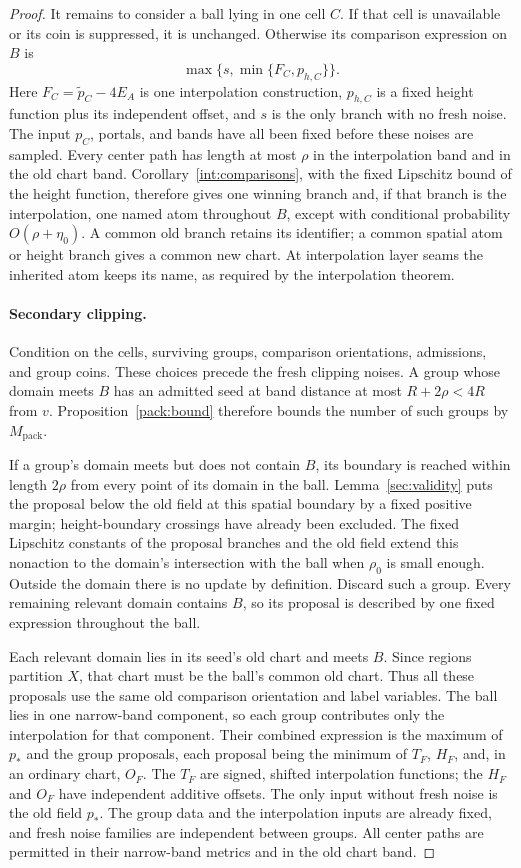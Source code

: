 \begin{proof}
It remains to consider a ball lying in one cell $C$. If that cell is
unavailable or its coin is suppressed, it is unchanged. Otherwise its
comparison expression on $B$ is
\[
 \max\{s,\min\{F_C,p_{h,C}\}\}.
\]
Here $F_C=\widetilde p_C-4E_A$ is one interpolation construction,
$p_{h,C}$ is a fixed height function plus its independent offset, and
$s$ is the only branch with no fresh noise. The input $p_C$, portals,
and bands have all been fixed before these noises are sampled.
Every center path has length at most $\rho$ in the interpolation band
and in the old chart band. Corollary~\ref{int:comparisons}, with the
fixed Lipschitz bound of the height function, therefore gives one
winning branch and, if that branch is the interpolation, one named atom throughout $B$,
except with conditional probability $O(\rho+\eta_0)$.
A common old branch retains its identifier; a common spatial atom or
height branch gives a common new chart. At interpolation layer seams
the inherited atom keeps its name, as required by the interpolation
theorem.

\paragraph{Secondary clipping.}
Condition on the cells, surviving groups, comparison orientations,
admissions, and group coins. These choices precede the fresh clipping
noises. A group whose domain meets $B$ has an admitted seed at band
distance at most $R+2\rho<4R$ from $v$. Proposition~\ref{pack:bound}
therefore bounds the number of such groups by $M_{\mathrm{pack}}$.

If a group's domain meets but does not contain $B$, its boundary is
reached within length $2\rho$ from every point of its domain in the
ball. Lemma~\ref{sec:validity} puts the proposal below the old field
at this spatial boundary by a fixed positive margin; height-boundary
crossings have already been excluded. The fixed Lipschitz constants
of the proposal branches and the old field extend this nonaction to
the domain's intersection with the ball when $\rho_0$ is small enough.
Outside the domain there is no update by definition. Discard such a group. Every
remaining relevant domain contains $B$, so its proposal is described
by one fixed expression throughout the ball.

Each relevant domain lies in its seed's old chart and meets $B$.
Since regions partition $X$, that chart must be the ball's common old
chart. Thus all these proposals use the same old comparison orientation
and label variables. The ball lies in one narrow-band component, so
each group contributes only the interpolation for that component. Their
combined expression is the maximum of $p_*$ and the group proposals,
each proposal being the minimum of $T_F$, $H_F$, and, in an ordinary
chart, $O_F$. The $T_F$ are signed, shifted interpolation functions;
the $H_F$ and $O_F$ have independent additive offsets. The only input
without fresh noise is the old field $p_*$. The group data and the
interpolation inputs are already fixed, and fresh noise families are
independent between groups. All center paths are permitted in their
narrow-band metrics and in the old chart band.


\end{proof}
